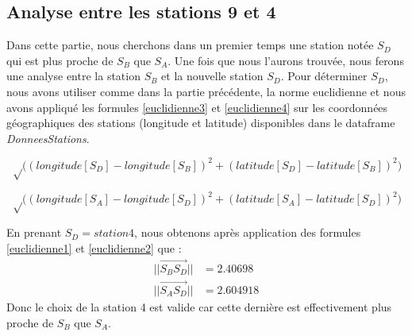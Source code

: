 \documentclass[a4paper,french,10pt]{article}
\begin{document}
\subsection{Analyse entre les stations 9 et 4}
Dans cette partie, nous cherchons dans un premier temps une station notée $S_D$ qui est plus proche de $S_B$ que $S_A$. Une fois que nous l'aurons trouvée, nous ferons une analyse entre la station $S_B$ et la nouvelle station $S_D$.
Pour déterminer $S_D$, nous avons utiliser comme dans la partie précédente, la norme euclidienne et nous avons appliqué les formules \ref{euclidienne3} et \ref{euclidienne4} sur les coordonnées géographiques des stations (longitude et latitude) disponibles dans le dataframe \textit{DonneesStations}.

\begin{equation}
	\label{euclidienne3}
	\sqrt \Big(  (longitude[S_D] - longitude[S_B])^2 + (latitude[S_D] - latitude[S_B])^2 \Big)
\end{equation}

\begin{equation}
	\label{euclidienne4}
	\sqrt \Big(  (longitude[S_A] - longitude[S_D])^2 + (latitude[S_A] - latitude[S_D])^2 \Big)
\end{equation}

En prenant $S_D = station4$, nous obtenons après application des formules \ref{euclidienne1} et \ref{euclidienne2} que :
\begin{align*}
	|| \overrightarrow{S_B S_D} || &=  2.40698 \\
	|| \overrightarrow{S_A S_D} || &=  2.604918
\end{align*}
Donc le choix de la station 4 est valide car cette dernière est effectivement plus proche de $S_B$ que $S_A$.

\vspace{3mm}
\end{document}
